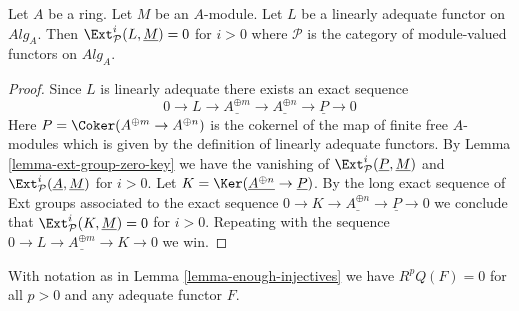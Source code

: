 \begin{lemma}
\label{lemma-ext-group-zero}
Let $A$ be a ring. Let $M$ be an $A$-module. Let $L$ be a linearly
adequate functor on $\textit{Alg}_A$. Then
$\Ext^i_\mathcal{P}(L, \underline{M}) = 0$
for $i > 0$ where $\mathcal{P}$ is the category of module-valued
functors on $\textit{Alg}_A$.
\end{lemma}

\begin{proof}
Since $L$ is linearly adequate there exists an exact sequence
$$
0 \to L \to \underline{A^{\oplus m}} \to \underline{A^{\oplus n}} \to
\underline{P} \to 0
$$
Here $P = \Coker(A^{\oplus m} \to A^{\oplus n})$ is the cokernel
of the map of finite free $A$-modules which is given by the definition
of linearly adequate functors. By
Lemma \ref{lemma-ext-group-zero-key}
we have the vanishing of
$\Ext^i_\mathcal{P}(\underline{P}, \underline{M})$
and
$\Ext^i_\mathcal{P}(\underline{A}, \underline{M})$
for $i > 0$.
Let $K = \Ker(\underline{A^{\oplus n}} \to \underline{P})$.
By the long exact sequence of Ext groups associated to the exact sequence
$0 \to K \to \underline{A^{\oplus n}} \to \underline{P} \to 0$
we conclude that
$\Ext^i_\mathcal{P}(K, \underline{M}) = 0$ for $i > 0$.
Repeating with the sequence
$0 \to L \to \underline{A^{\oplus m}} \to K \to 0$
we win.
\end{proof}

\begin{lemma}
\label{lemma-RQ-zero}
With notation as in
Lemma \ref{lemma-enough-injectives}
we have $R^pQ(F) = 0$ for all $p > 0$ and any adequate functor $F$.
\end{lemma}

